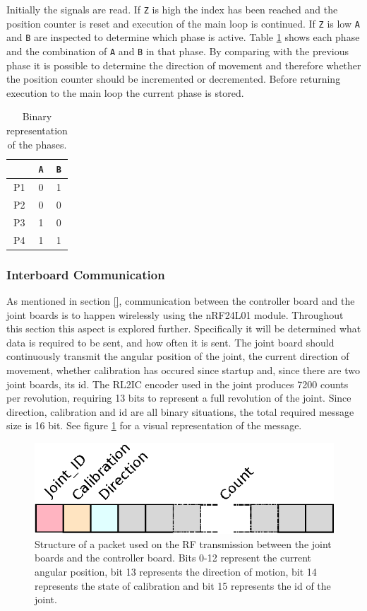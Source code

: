 {Initially the signals are read.
If \texttt{Z} is high the index has been reached and the position counter is reset and execution of the main loop is continued.
If \texttt{Z} is low \texttt{A} and \texttt{B} are inspected to determine which phase is active.
Table \ref{tab:bin_phase} shows each phase and the combination of \texttt{A} and \texttt{B} in that phase.
By comparing with the previous phase it is possible to determine the direction of movement and therefore whether the position counter should be incremented or decremented.
Before returning execution to the main loop the current phase is stored. 

\begin{table}
	\centering
	\begin{tabular}{c | c  c}
		& \texttt{A} & \texttt{B}\\
		\hline
		P1 & 0 & 1\\
		P2 & 0 & 0\\
		P3 & 1 & 0\\
		P4 & 1 & 1
	\end{tabular}
	\caption{Binary representation of the phases.}
	\label{tab:bin_phase}
\end{table}

\subsubsection{Interboard Communication} %
\label{ssub:interboard_communication}
As mentioned in section \ref{}, communication between the controller board and the joint boards is to happen wirelessly using the nRF24L01 module.
Throughout this section this aspect is explored further.
Specifically it will be determined what data is required to be sent, and how often it is sent.
The joint board should continuously transmit the angular position of the joint, the current direction of movement, whether calibration has occured since startup and, since there are two joint boards, its id.
The RL2IC encoder used in the joint produces 7200 counts per revolution, requiring 13 bits to represent a full revolution of the joint.
Since direction, calibration and id are all binary situations, the total required message size is 16 bit.
See figure \ref{fig:rfpacket} for a visual representation of the message.

\begin{figure}[h]
	\centering
	\includegraphics[width=.5\linewidth]{graphics/rf_packet}
	\caption[Structure of a packet used on the RF transmission between the joint boards and the controller board.]{Structure of a packet used on the RF transmission between the joint boards and the controller board. Bits 0-12 represent the current angular position, bit 13 represents the direction of motion, bit 14 represents the state of calibration and bit 15 represents the id of the joint.}
	\label{fig:rfpacket}
\end{figure}

}

